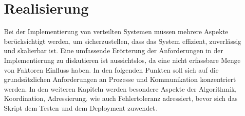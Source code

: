 \documentclass[../vs-script-first-v01.tex]{subfiles}
\begin{document}
\section{Realisierung}
Bei der Implementierung von verteilten Systemen müssen mehrere Aspekte berücksichtigt werden, um sicherzustellen, dass das System effizient, zuverlässig und skalierbar ist. Eine umfassende Erörterung der Anforderungen in der Implementierung zu diskutieren ist aussichtslos, da eine nicht erfassbare Menge von Faktoren Einfluss haben. In den folgenden Punkten soll sich auf die grundsätzlichen Anforderungen an Prozesse und Kommunikation konzentriert werden. In den weiteren Kapiteln werden besondere Aspekte der Algorithmik, Koordination, Adressierung, wie auch Fehlertoleranz adressiert, bevor sich das Skript dem Testen und  dem Deployment zuwendet. 
\end{document}
